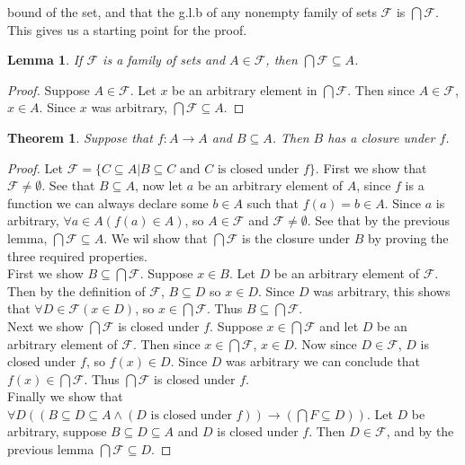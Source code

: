 \documentclass{report}
\newtheorem*{theorem}{Theorem}
\newtheorem*{lemma}{Lemma}
\theoremstyle{definition}
\begin{document}
bound of the set, and that the g.l.b of any nonempty family of sets $\mathcal F$ is $\bigcap\mathcal F$. This gives us a starting point for the proof.
\begin{lemma}
If $\mathcal F$ is a family of sets and $A\in\mathcal F$, then $\bigcap\mathcal F\subseteq A$.
\end{lemma}
\begin{proof}
Suppose $A\in\mathcal F$. Let $x$ be an arbitrary element in $\bigcap\mathcal F$. Then since $A\in\mathcal F$, $x\in A$. Since $x$ was arbitrary, $\bigcap\mathcal F\subseteq A$.
\end{proof}
\begin{theorem}
Suppose that $f:A\to A$ and $B\subseteq A$. Then $B$ has a closure under $f$.
\end{theorem}
\begin{proof}
Let $\mathcal F=\{C\subseteq A|B\subseteq C\text{ and $C$ is closed under $f$}\}$. First we show that $\mathcal F\neq\emptyset$. See that $B\subseteq A$, now let $a$ be an arbitrary element of $A$,
since $f$ is a function we can always declare some $b\in A$ such that $f(a)=b\in A$. Since $a$ is arbitrary, $\forall a\in A(f(a)\in A)$, so $A\in\mathcal F$ and $\mathcal F\neq\emptyset$.
See that by the previous lemma, $\bigcap\mathcal F\subseteq A$.
We wil show that $\bigcap\mathcal F$ is the closure under $B$ by proving the three required properties.\\
\indent First we show $B\subseteq\bigcap\mathcal F$. Suppose $x\in B$. Let $D$ be an arbitrary element of $\mathcal F$. Then by the definition of $\mathcal F$, $B\subseteq D$ so $x\in D$. 
Since $D$ was arbitrary, this shows that $\forall D\in\mathcal F(x\in D)$, so $x\in\bigcap\mathcal F$. Thus $B\subseteq\bigcap\mathcal F$.\\
\indent Next we show $\bigcap\mathcal F$ is closed under $f$. Suppose $x\in\bigcap\mathcal F$ and let $D$ be an arbitrary element of $\mathcal F$. Then since $x\in\bigcap\mathcal F$, $x\in D$. Now 
since $D\in\mathcal F$, $D$ is closed under $f$, so $f(x)\in D$. Since $D$ was arbitrary we can conclude that $f(x)\in\bigcap\mathcal F$. Thus $\bigcap\mathcal F$ is closed under $f$.\\
\indent Finally we show that $\forall D((B\subseteq D\subseteq A\land(\text{$D$ is closed under $f$}))\to(\bigcap F\subseteq D))$. 
Let $D$ be arbitrary, suppose $B\subseteq D\subseteq A$ and $D$ is closed under $f$. Then $D\in\mathcal F$, and by the previous lemma $\bigcap\mathcal F\subseteq D$.
\end{proof}
\newpage
\end{document}
